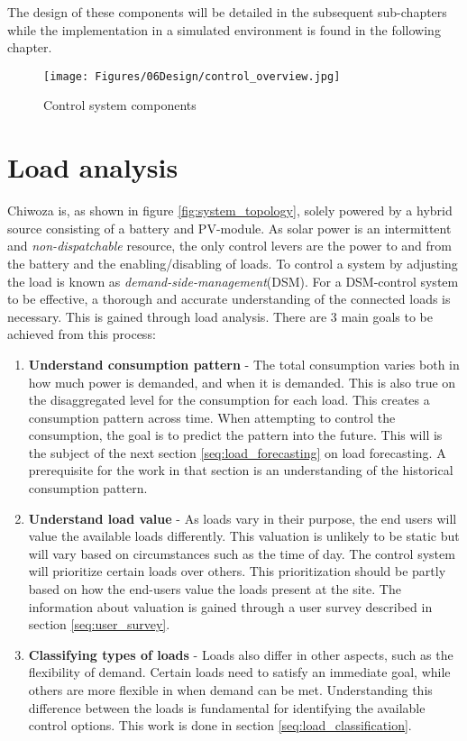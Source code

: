 The design of these components will be detailed in the subsequent sub-chapters while the implementation in a simulated environment is found in the following chapter.

\begin{figure}[!h]
    \centering
    \texttt{[image: Figures/06Design/control\_overview.jpg]}
    \caption[Control system components]{Control system components}
    \label{fig:control_syst}
\end{figure}


\section{Load analysis}

Chiwoza is, as shown in figure \ref{fig:system_topology}, solely powered by a hybrid source consisting of a battery and PV-module. As solar power is an intermittent and \textit{non-dispatchable} resource, the only control levers are the power to and from the battery and the enabling/disabling of loads. To control a system by adjusting the load is known as \textit{demand-side-management}(DSM). For a DSM-control system to be effective, a thorough and accurate understanding of the connected loads is necessary. This is gained through load analysis. There are 3 main goals to be achieved from this process:
\begin{enumerate}
    \item \textbf{Understand consumption pattern}    - The total consumption varies both in how much power is demanded, and when it is demanded. This is also true on the disaggregated level for the consumption for each load. This creates a consumption pattern across time. When attempting to control the consumption, the goal is to predict the pattern into the future. This will is the subject of the next section \ref{seq:load_forecasting} on load forecasting. A prerequisite for the work in that section is an understanding of the historical consumption pattern.
    \item \textbf{Understand load value}    -   As loads vary in their purpose, the end users will value the available loads differently. This valuation is unlikely to be static but will vary based on circumstances such as the time of day. The control system will prioritize certain loads over others. This prioritization should be partly based on how the end-users value the loads present at the site. The information about valuation is gained through a user survey described in section \ref{seq:user_survey}.
    \item \textbf{Classifying types of loads}   -   Loads also differ in other aspects, such as the flexibility of demand. Certain loads need to satisfy an immediate goal, while others are more flexible in when demand can be met. Understanding this difference between the loads is fundamental for identifying the available control options. This work is done in section \ref{seq:load_classification}.
\end{enumerate}

